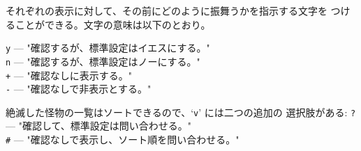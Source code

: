 それぞれの表示に対して、その前にどのように振舞うかを指示する文字を
つけることができる。文字の意味は以下のとおり。

{\tt y} --- "確認するが、標準設定はイエスにする。"\\
{\tt n} --- "確認するが、標準設定はノーにする。"\\
{\tt +} --- "確認なしに表示する。"\\
{\tt -} --- "確認なしで非表示とする。"

絶滅した怪物の一覧はソートできるので、`{\tt v}' には二つの追加の
選択肢がある:
{\tt ?} --- "確認して、標準設定は問い合わせる。"\\
{\tt\#} --- "確認なしで表示し、ソート順を問い合わせる。"


